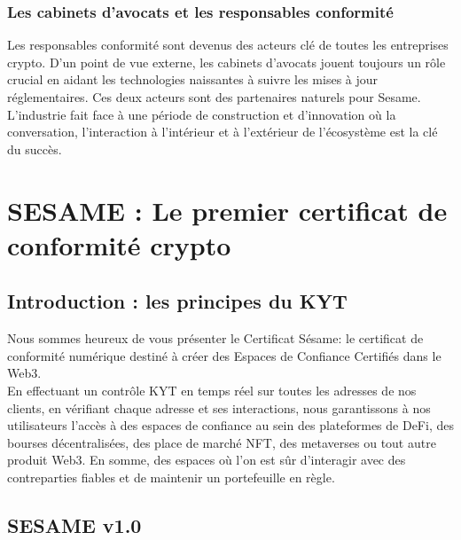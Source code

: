 ﻿\documentclass[a4paper]{article}
\let\OldTexttrademark\texttrademark
\renewcommand{\texttrademark}{\OldTexttrademark\xspace}%
\begin{document}
\subsubsection{Les cabinets d’avocats et les responsables conformité}
Les responsables conformité sont devenus des acteurs clé de toutes les entreprises crypto. D’un point de vue externe, les cabinets d'avocats jouent toujours un rôle crucial en aidant les technologies naissantes à suivre les mises à jour réglementaires. 
Ces deux acteurs sont des partenaires naturels pour Sesame. L'industrie fait face à une période de construction et d'innovation où la conversation, l'interaction à l'intérieur et à l'extérieur de l'écosystème est la clé du succès.

\newpage
\section{SESAME : Le premier certificat de conformité crypto}
\subsection{Introduction : les principes du KYT}
Nous sommes heureux de vous présenter le Certificat Sésame: le certificat de conformité numérique destiné à créer des Espaces de Confiance Certifiés\texttrademark dans le Web3. \\

En effectuant un contrôle KYT en temps réel sur toutes les adresses de nos clients, en vérifiant chaque adresse et ses interactions, nous garantissons à nos utilisateurs l'accès à des espaces de confiance au sein des plateformes de DeFi, des bourses décentralisées, des place de marché NFT, des metaverses ou tout autre produit Web3. En somme, des espaces où l'on est sûr d'interagir avec des contreparties fiables et de maintenir un portefeuille en règle.

\subsection{SESAME v1.0}
\end{document}
